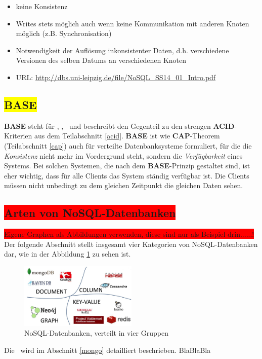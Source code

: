 \begin{itemize}
\item keine Konsistenz
\item Writes stets möglich auch wenn keine Kommunikation mit anderen Knoten möglich
(z.B. Synchronisation)
\item Notwendigkeit der Auflösung inkonsistenter Daten, d.h. verschiedene Versionen des
selben Datums an verschiedenen Knoten
\item URL: \url{http://dbs.uni-leipzig.de/file/NoSQL_SS14_01_Intro.pdf}
\end{itemize}

\subsection{\colorbox{yellow}{BASE}}
\textbf{BASE} steht für \BAse, \baSe, \basE\ und beschreibt den Gegenteil zu den strengen \textbf{ACID}-Kriterien aus dem Teilabschnitt \ref{acid}. \textbf{BASE} ist wie \textbf{CAP}-Theorem (Teilabschnitt \ref{cap}) auch für verteilte Datenbanksysteme formuliert, für die die \textit{Konsistenz} nicht mehr im Vordergrund steht, sondern die \textit{Verfügbarkeit} eines Systems. Bei solchen Systemen, die nach dem \textbf{BASE}-Prinzip gestaltet sind, ist eher wichtig, dass für alle Clients das System ständig verfügbar ist. Die Clients müssen nicht unbedingt zu dem gleichen Zeitpunkt die gleichen Daten sehen.

\subsection{\colorbox{red}{Arten von NoSQL-Datenbanken}}\label{categoryNoSQL}
\colorbox{red}{Eigene Graphen als Abbildungen verwenden, diese sind nur als Beispiel drin......!}
Der folgende Abschnitt stellt insgesamt vier Kategorien von NoSQL-Datenbanken dar, wie in der Abbildung \ref{img:nosqlgroups} zu sehen ist.
\begin{figure}[H]
\centering
\includegraphics[width=0.5\textwidth]{resources/nosqlgroups}
\caption[NoSQL-Datenbanken]{NoSQL-Datenbanken, verteilt in vier Gruppen\protect\footnotemark}
\label{img:nosqlgroups}
\end{figure}
Die \mongo\ wird im Abschnitt \ref{mongo} detailliert beschrieben. BlaBlaBla
